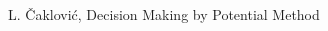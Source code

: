\documentclass[letterpaper, 10pt, conference]{ieeeconf}
\begin{document}
  

  \begin{thebibliography}{9} %
    
   L. \v{C}aklovi\'{c}, Decision Making by Potential Method

\end{thebibliography}
\end{document}

